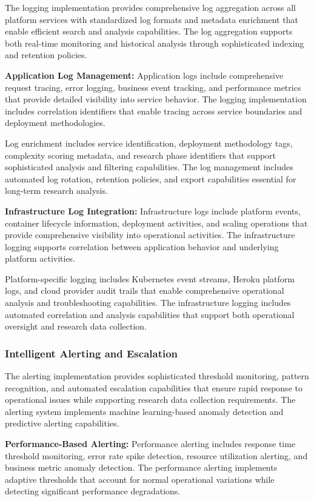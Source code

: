 The logging implementation provides comprehensive log aggregation across all platform services with standardized log formats and metadata enrichment that enable efficient search and analysis capabilities. The log aggregation supports both real-time monitoring and historical analysis through sophisticated indexing and retention policies.

\textbf{Application Log Management:}
Application logs include comprehensive request tracing, error logging, business event tracking, and performance metrics that provide detailed visibility into service behavior. The logging implementation includes correlation identifiers that enable tracing across service boundaries and deployment methodologies.

Log enrichment includes service identification, deployment methodology tags, complexity scoring metadata, and research phase identifiers that support sophisticated analysis and filtering capabilities. The log management includes automated log rotation, retention policies, and export capabilities essential for long-term research analysis.

\textbf{Infrastructure Log Integration:}
Infrastructure logs include platform events, container lifecycle information, deployment activities, and scaling operations that provide comprehensive visibility into operational activities. The infrastructure logging supports correlation between application behavior and underlying platform activities.

Platform-specific logging includes Kubernetes event streams, Heroku platform logs, and cloud provider audit trails that enable comprehensive operational analysis and troubleshooting capabilities. The infrastructure logging includes automated correlation and analysis capabilities that support both operational oversight and research data collection.

\subsubsection{Intelligent Alerting and Escalation}

The alerting implementation provides sophisticated threshold monitoring, pattern recognition, and automated escalation capabilities that ensure rapid response to operational issues while supporting research data collection requirements. The alerting system implements machine learning-based anomaly detection and predictive alerting capabilities.

\textbf{Performance-Based Alerting:}
Performance alerting includes response time threshold monitoring, error rate spike detection, resource utilization alerting, and business metric anomaly detection. The performance alerting implements adaptive thresholds that account for normal operational variations while detecting significant performance degradations.

